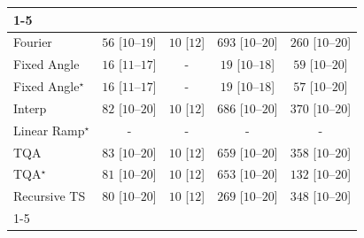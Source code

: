 \begin{tabular}{l|cccc|}
\cline{1-5}
\multicolumn{5}{c}{\rule{0pt}{8pt}SV} \\
\midrule
Fourier & {\cellcolor[HTML]{EDF8EA}} \color[HTML]{000000} $56$ [$10$--$19$] & {\cellcolor[HTML]{F7FCF5}} \color[HTML]{000000} $10$ [$12$] & {\cellcolor[HTML]{00441B}} \color[HTML]{F1F1F1} $693$ [$10$--$20$] & {\cellcolor[HTML]{A4DA9E}} \color[HTML]{000000} $260$ [$10$--$20$] \\
Fixed Angle & {\cellcolor[HTML]{F6FCF4}} \color[HTML]{000000} $16$ [$11$--$17$] & {\cellcolor[HTML]{000000}} \color[HTML]{F1F1F1} {\cellcolor{white}} \color{black} - & {\cellcolor[HTML]{F5FBF3}} \color[HTML]{000000} $19$ [$10$--$18$] & {\cellcolor[HTML]{EDF8E9}} \color[HTML]{000000} $59$ [$10$--$20$] \\
Fixed Angle$^\star$ & {\cellcolor[HTML]{F6FCF4}} \color[HTML]{000000} $16$ [$11$--$17$] & {\cellcolor[HTML]{000000}} \color[HTML]{F1F1F1} {\cellcolor{white}} \color{black} - & {\cellcolor[HTML]{F5FBF3}} \color[HTML]{000000} $19$ [$10$--$18$] & {\cellcolor[HTML]{EDF8EA}} \color[HTML]{000000} $57$ [$10$--$20$] \\
Interp & {\cellcolor[HTML]{E8F6E4}} \color[HTML]{000000} $82$ [$10$--$20$] & {\cellcolor[HTML]{F7FCF5}} \color[HTML]{000000} $10$ [$12$] & {\cellcolor[HTML]{00471C}} \color[HTML]{F1F1F1} $686$ [$10$--$20$] & {\cellcolor[HTML]{6ABF71}} \color[HTML]{000000} $370$ [$10$--$20$] \\
Linear Ramp$^\star$ & {\cellcolor[HTML]{000000}} \color[HTML]{F1F1F1} {\cellcolor{white}} \color{black} - & {\cellcolor[HTML]{000000}} \color[HTML]{F1F1F1} {\cellcolor{white}} \color{black} - & {\cellcolor[HTML]{000000}} \color[HTML]{F1F1F1} {\cellcolor{white}} \color{black} - & {\cellcolor[HTML]{000000}} \color[HTML]{F1F1F1} {\cellcolor{white}} \color{black} - \\
TQA & {\cellcolor[HTML]{E8F6E3}} \color[HTML]{000000} $83$ [$10$--$20$] & {\cellcolor[HTML]{F7FCF5}} \color[HTML]{000000} $10$ [$12$] & {\cellcolor[HTML]{005321}} \color[HTML]{F1F1F1} $659$ [$10$--$20$] & {\cellcolor[HTML]{70C274}} \color[HTML]{000000} $358$ [$10$--$20$] \\
TQA$^\star$ & {\cellcolor[HTML]{E8F6E4}} \color[HTML]{000000} $81$ [$10$--$20$] & {\cellcolor[HTML]{F7FCF5}} \color[HTML]{000000} $10$ [$12$] & {\cellcolor[HTML]{005622}} \color[HTML]{F1F1F1} $653$ [$10$--$20$] & {\cellcolor[HTML]{D9F0D3}} \color[HTML]{000000} $132$ [$10$--$20$] \\
Recursive TS & {\cellcolor[HTML]{E8F6E4}} \color[HTML]{000000} $80$ [$10$--$20$] & {\cellcolor[HTML]{F7FCF5}} \color[HTML]{000000} $10$ [$12$] & {\cellcolor[HTML]{9FD899}} \color[HTML]{000000} $269$ [$10$--$20$] & {\cellcolor[HTML]{76C578}} \color[HTML]{000000} $348$ [$10$--$20$] \\
\cline{1-5}
\bottomrule
\end{tabular}

